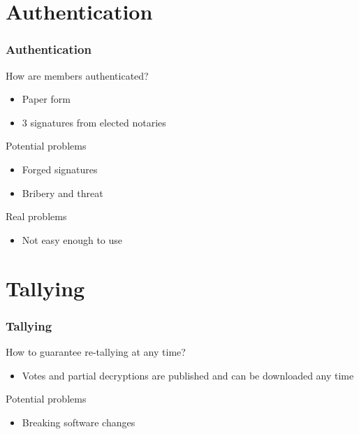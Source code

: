 \documentclass[aspectratio=1610, compress, bigger]{beamer}
\begin{document}
\section{Authentication}
\begin{frame}\frametitle{Authentication}

\begin{block}{How are members authenticated?}
\begin{itemize}
\item Paper form 
\item 3 signatures from elected notaries
\end{itemize}
\end{block}

\pause

\begin{alertblock}{Potential problems}
\begin{itemize}
\item Forged signatures
\item Bribery and threat
\end{itemize}
\end{alertblock}

\pause

\begin{alertblock}{Real problems}
\begin{itemize}
\item Not easy enough to use
\end{itemize}
\end{alertblock}

\end{frame}

\section{Tallying}
\begin{frame}\frametitle{Tallying}

\begin{block}{How to guarantee re-tallying at any time?}
\begin{itemize}
\item Votes and partial decryptions are published and can be downloaded any time
\end{itemize}
\end{block}

\pause

\begin{alertblock}{Potential problems}
\begin{itemize}
\item Breaking software changes
\end{itemize}
\end{alertblock}

\end{frame}
\end{document}
